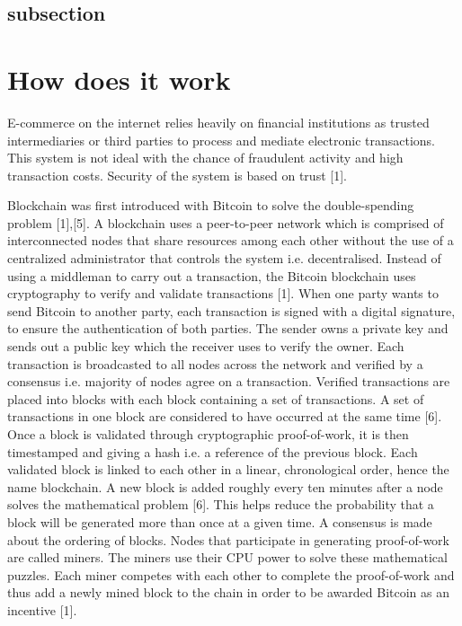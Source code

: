 \documentclass[report]{IEEEtran}
\begin{document}
\subsection{subsection}

\section{How does it work}
E-commerce on the internet relies heavily on financial institutions as trusted intermediaries or third parties to process and mediate electronic transactions. This system is not ideal with the chance of fraudulent activity and high transaction costs. Security of the system is based on trust [1]. 

Blockchain was first introduced with Bitcoin to solve the double-spending problem [1],[5]. A blockchain uses a peer-to-peer network which is comprised of interconnected nodes that share resources among each other without the use of a centralized administrator that controls the system i.e. decentralised. Instead of using a middleman to carry out a transaction, the Bitcoin blockchain uses cryptography to verify and validate transactions [1]. When one party wants to send Bitcoin to another party, each transaction is signed with a digital signature, to ensure the authentication of both parties. The sender owns a private key and sends out a public key which the receiver uses to verify the owner. Each transaction is broadcasted to all nodes across the network and verified by a consensus i.e. majority of nodes agree on a transaction. Verified transactions are placed into blocks with each block containing a set of transactions. A set of transactions in one block are considered to have occurred at the same time [6]. Once a block is validated through cryptographic proof-of-work, it is then timestamped and giving a hash i.e. a reference of the previous block. Each validated block is linked to each other in a linear, chronological order, hence the name blockchain. A new block is added roughly every ten minutes after a node solves the mathematical problem [6]. This helps reduce the probability that a block will be generated more than once at a given time. A consensus is made about the ordering of blocks. Nodes that participate in generating proof-of-work are called miners. The miners use their CPU power to solve these mathematical puzzles. Each miner competes with each other to complete the proof-of-work and thus add a newly mined block to the chain in order to be awarded Bitcoin as an incentive [1].  
\end{document}
